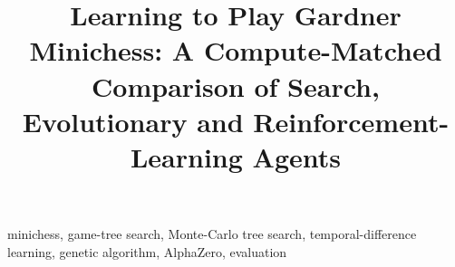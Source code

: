 \documentclass[conference]{IEEEtran}
\begin{document}
\title{Learning to Play Gardner Minichess: A Compute-Matched Comparison of Search, Evolutionary and Reinforcement-Learning Agents}

\author{
}

\maketitle

\begin{abstract}

\end{abstract}

\begin{IEEEkeywords}
minichess, game-tree search, Monte-Carlo tree search, temporal-difference learning, genetic algorithm, AlphaZero, evaluation
\end{IEEEkeywords}




\balance

\end{document}
